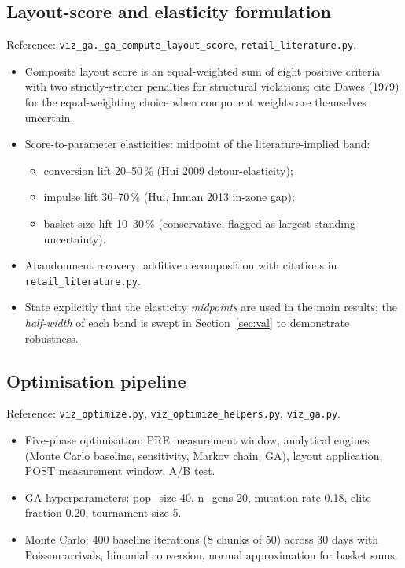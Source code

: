 \documentclass[11pt]{article}
\begin{document}
\subsection{Layout-score and elasticity formulation}
Reference: \texttt{viz\_ga.\_ga\_compute\_layout\_score},
\texttt{retail\_literature.py}.
\begin{itemize}[leftmargin=*]
  \item Composite layout score is an equal-weighted sum of eight
    positive criteria with two strictly-stricter penalties for
    structural violations; cite Dawes (1979) for the equal-weighting
    choice when component weights are themselves uncertain.
  \item Score-to-parameter elasticities: midpoint of the
    literature-implied band:
    \begin{itemize}
      \item conversion lift 20--50\,\% (Hui 2009 detour-elasticity);
      \item impulse lift 30--70\,\% (Hui, Inman 2013 in-zone gap);
      \item basket-size lift 10--30\,\% (conservative, flagged as
        largest standing uncertainty).
    \end{itemize}
  \item Abandonment recovery: additive decomposition with citations
    in \texttt{retail\_literature.py}.
  \item State explicitly that the elasticity \emph{midpoints} are
    used in the main results; the \emph{half-width} of each band is
    swept in Section~\ref{sec:val} to demonstrate robustness.
\end{itemize}

\subsection{Optimisation pipeline}
Reference: \texttt{viz\_optimize.py},
\texttt{viz\_optimize\_helpers.py}, \texttt{viz\_ga.py}.
\begin{itemize}[leftmargin=*]
  \item Five-phase optimisation: PRE measurement window, analytical
    engines (Monte Carlo baseline, sensitivity, Markov chain, GA),
    layout application, POST measurement window, A/B test.
  \item GA hyperparameters: pop\_size 40, n\_gens 20, mutation
    rate 0.18, elite fraction 0.20, tournament size 5.
  \item Monte Carlo: 400 baseline iterations (8 chunks of 50) across
    30 days with Poisson arrivals, binomial conversion, normal
    approximation for basket sums.
\end{itemize}
\end{document}
